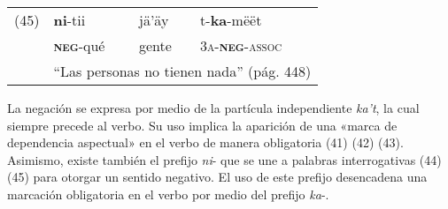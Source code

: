 {%
\begin{tabular}{llll}
(45) & \textbf{ni}-tii & jä'äy & t-\textbf{ka}-mëët \\
& \textsc{\textbf{neg}}-qué & gente & \textsc{3a-\textbf{neg}-assoc} \\
& \multicolumn{3}{l}{``Las personas no tienen nada'' (pág. 448)}
\end{tabular} \vspace{0.5cm}

}

La negación se expresa por medio de la partícula independiente {\setmainfont{Charis SIL} \textit{ka't}}, la cual siempre precede al verbo. Su uso implica la aparición de una «marca de dependencia aspectual» \textcolor{MidnightBlue}{\citep{mixe}} en el verbo de manera obligatoria (41) (42) (43). Asimismo, existe también el prefijo {\setmainfont{Charis SIL} \textit{ni}-} que se une a palabras interrogativas (44) (45) para otorgar un sentido negativo. El uso de este prefijo desencadena una marcación obligatoria en el verbo por medio del prefijo {\setmainfont{Charis SIL} \textit{ka}-}.